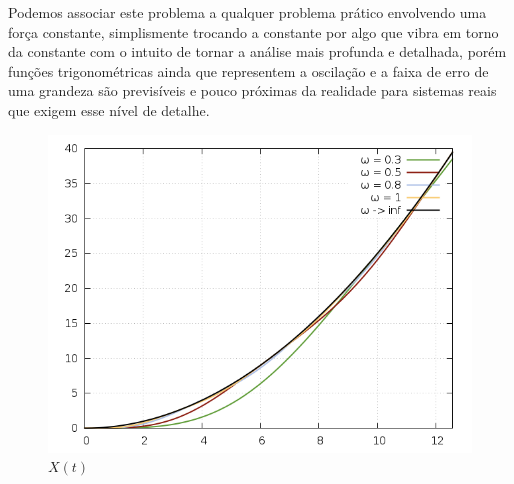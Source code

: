 \documentclass[a4paper,12pt]{article}
\begin{document}
		Podemos associar este problema a qualquer problema prático envolvendo uma força constante, simplismente trocando a constante por algo que vibra em torno da constante
		com o intuito de tornar a análise mais profunda e detalhada, porém funções trigonométricas ainda que representem a oscilação e a faixa de erro de uma grandeza são previsíveis
		e pouco próximas da realidade para sistemas reais que exigem esse nível de detalhe. 
		\begin{figure}[h]
			\centering
			\includegraphics[scale=0.6]{1o4.png}
			\caption{$X(t)$}
		\end{figure}


	
\end{document}
